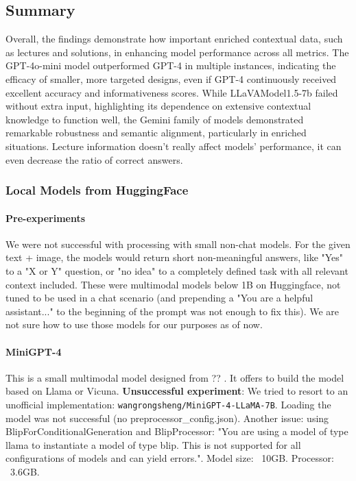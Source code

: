 \documentclass[10pt]{article}
\begin{document}
\subsection{Summary}
Overall, the findings demonstrate how important enriched contextual data, such as lectures and solutions, in enhancing model performance across all metrics. The GPT-4o-mini model outperformed GPT-4 in multiple instances, indicating the efficacy of smaller, more targeted designs, even if GPT-4 continuously received excellent accuracy and informativeness scores. While LLaVAModel1.5-7b failed without extra input, highlighting its dependence on extensive contextual knowledge to function well, the Gemini family of models demonstrated remarkable robustness and semantic alignment, particularly in enriched situations.
Lecture information doesn’t really affect models’ performance, it can even decrease the ratio of correct answers.


\subsubsection{Local Models from HuggingFace}

\paragraph{Pre-experiments} We were not successful with processing with small non-chat models. For the given text + image, the models would return short non-meaningful answers, like "Yes" to a "X or Y" question, or "no idea" to a completely defined task with all relevant context included. These were multimodal models below 1B on Huggingface, not tuned to be used in a chat scenario (and prepending a "You are a helpful assistant..." to the beginning of the prompt was not enough to fix this). 
We are not sure how to use those models for our purposes as of now. 

\paragraph{MiniGPT-4} This is a small multimodal model designed from ?? \cite{zhu2023minigpt}. It offers to build the model based on Llama or Vicuna. 
\textbf{Unsuccessful experiment}: We tried to resort to an unofficial implementation: \texttt{wangrongsheng/MiniGPT-4-LLaMA-7B}. Loading the model was not successful (no preprocessor\_config.json). 
Another issue: using BlipForConditionalGeneration and BlipProcessor: "You are using a model of type llama to instantiate a model of type blip. This is not supported for all configurations of models and can yield errors.". Model size: ~10GB. Processor: ~3.6GB. 
\end{document}

